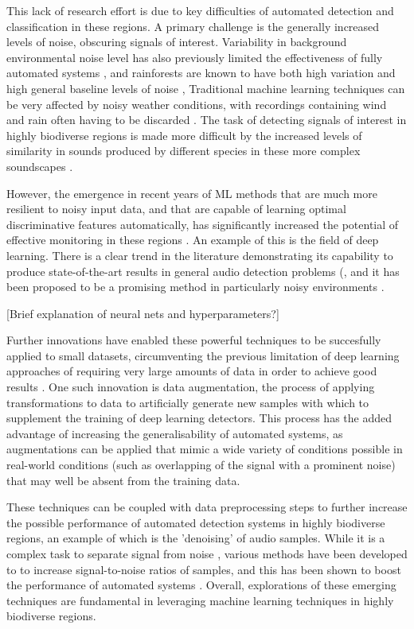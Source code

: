 \documentclass[11pt]{article}
\begin{document}
This lack of research effort is due to key difficulties of automated detection and classification in these regions. A primary challenge is the generally increased levels of noise, obscuring signals of interest. Variability in background environmental noise level has also previously limited the effectiveness of fully automated systems \citep{heinicke2015assessing}, and rainforests are known to have both high variation and high general baseline levels of noise \citep{waser1977experimental}, Traditional machine learning techniques can be very affected by noisy weather conditions, with recordings containing wind and rain often having to be discarded \citep{stowell2018automatic}. The task of detecting signals of interest in highly biodiverse regions is made more difficult by the increased levels of similarity in sounds produced by different species in these more complex soundscapes \citep{zamora2016acoustic}. 

However, the emergence in recent years of ML methods that are much more resilient to noisy input data, and that are capable of learning optimal discriminative features automatically, has significantly increased the potential of effective monitoring in these regions \citep{browning2017passive}. An example of this is the field of deep learning. There is a clear trend in the literature demonstrating its capability to produce state-of-the-art results in general audio detection problems (\citep{joly2016lifeclef,knight2017recommendations,kahl2017large}, and it has been proposed to be a promising method in particularly noisy environments \citep{browning2017passive}. 

[Brief explanation of neural nets and hyperparameters?]

Further innovations have enabled these powerful techniques to be succesfully applied to small datasets, circumventing the previous limitation of deep learning approaches of requiring very large amounts of data in order to achieve good results \citep{kiskin2017mosquito,salamon2017deep}. One such innovation is data augmentation, the process of applying transformations to data to artificially generate new samples with which to supplement the training of deep learning detectors. This process has the added advantage of increasing the generalisability of automated systems, as augmentations can be applied that mimic a wide variety of conditions possible in real-world conditions (such as overlapping of the signal with a prominent noise) that may well be absent from the training data. 

These techniques can be coupled with data preprocessing steps to further increase the possible performance of automated detection systems in highly biodiverse regions, an example of which is the 'denoising' of audio samples. While it is a complex task to separate signal from noise \citep{ovaskainen2018animal}, various methods have been developed to to increase signal-to-noise ratios of samples, and this has been shown to boost the performance of automated systems \citep{stowell2016bird}. Overall, explorations of these emerging techniques are fundamental in leveraging machine learning techniques in highly biodiverse regions.
\end{document}

